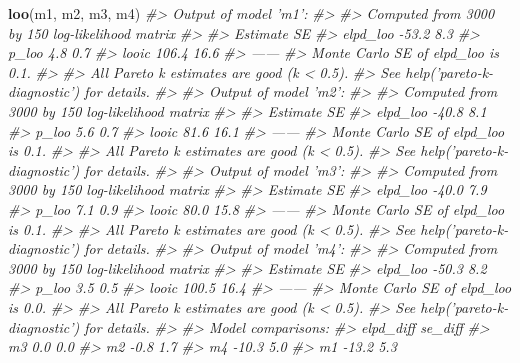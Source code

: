 \documentclass[]{book}
\newenvironment{Shaded}{\begin{snugshade}}{\end{snugshade}}
\newcommand{\KeywordTok}[1]{\textcolor[rgb]{0.13,0.29,0.53}{\textbf{#1}}}
\newcommand{\CommentTok}[1]{\textcolor[rgb]{0.56,0.35,0.01}{\textit{#1}}}
\newcommand{\NormalTok}[1]{#1}
\begin{document}
\begin{Shaded}
\begin{Highlighting}[]
\KeywordTok{loo}\NormalTok{(m1, m2, m3, m4)}
\CommentTok{#> Output of model 'm1':}
\CommentTok{#> }
\CommentTok{#> Computed from 3000 by 150 log-likelihood matrix}
\CommentTok{#> }
\CommentTok{#>          Estimate   SE}
\CommentTok{#> elpd_loo    -53.2  8.3}
\CommentTok{#> p_loo         4.8  0.7}
\CommentTok{#> looic       106.4 16.6}
\CommentTok{#> ------}
\CommentTok{#> Monte Carlo SE of elpd_loo is 0.1.}
\CommentTok{#> }
\CommentTok{#> All Pareto k estimates are good (k < 0.5).}
\CommentTok{#> See help('pareto-k-diagnostic') for details.}
\CommentTok{#> }
\CommentTok{#> Output of model 'm2':}
\CommentTok{#> }
\CommentTok{#> Computed from 3000 by 150 log-likelihood matrix}
\CommentTok{#> }
\CommentTok{#>          Estimate   SE}
\CommentTok{#> elpd_loo    -40.8  8.1}
\CommentTok{#> p_loo         5.6  0.7}
\CommentTok{#> looic        81.6 16.1}
\CommentTok{#> ------}
\CommentTok{#> Monte Carlo SE of elpd_loo is 0.1.}
\CommentTok{#> }
\CommentTok{#> All Pareto k estimates are good (k < 0.5).}
\CommentTok{#> See help('pareto-k-diagnostic') for details.}
\CommentTok{#> }
\CommentTok{#> Output of model 'm3':}
\CommentTok{#> }
\CommentTok{#> Computed from 3000 by 150 log-likelihood matrix}
\CommentTok{#> }
\CommentTok{#>          Estimate   SE}
\CommentTok{#> elpd_loo    -40.0  7.9}
\CommentTok{#> p_loo         7.1  0.9}
\CommentTok{#> looic        80.0 15.8}
\CommentTok{#> ------}
\CommentTok{#> Monte Carlo SE of elpd_loo is 0.1.}
\CommentTok{#> }
\CommentTok{#> All Pareto k estimates are good (k < 0.5).}
\CommentTok{#> See help('pareto-k-diagnostic') for details.}
\CommentTok{#> }
\CommentTok{#> Output of model 'm4':}
\CommentTok{#> }
\CommentTok{#> Computed from 3000 by 150 log-likelihood matrix}
\CommentTok{#> }
\CommentTok{#>          Estimate   SE}
\CommentTok{#> elpd_loo    -50.3  8.2}
\CommentTok{#> p_loo         3.5  0.5}
\CommentTok{#> looic       100.5 16.4}
\CommentTok{#> ------}
\CommentTok{#> Monte Carlo SE of elpd_loo is 0.0.}
\CommentTok{#> }
\CommentTok{#> All Pareto k estimates are good (k < 0.5).}
\CommentTok{#> See help('pareto-k-diagnostic') for details.}
\CommentTok{#> }
\CommentTok{#> Model comparisons:}
\CommentTok{#>    elpd_diff se_diff}
\CommentTok{#> m3   0.0       0.0  }
\CommentTok{#> m2  -0.8       1.7  }
\CommentTok{#> m4 -10.3       5.0  }
\CommentTok{#> m1 -13.2       5.3}
\end{Highlighting}
\end{Shaded}
\end{document}
